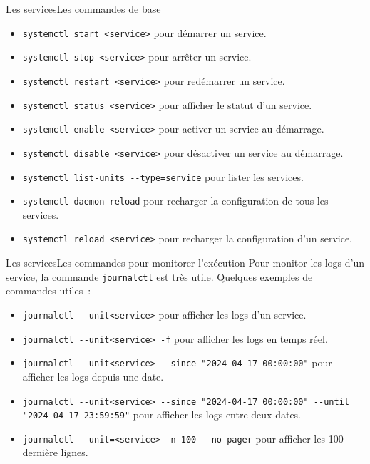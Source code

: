 \documentclass{beamer}
\begin{document}
    \begin{frame}{Les services}{Les commandes de base}
        \begin{itemize}
            \item \lstinline{systemctl start <service>} pour démarrer un service.
            \item \lstinline{systemctl stop <service>} pour arrêter un service.
            \item \lstinline{systemctl restart <service>} pour redémarrer un service.
            \item \lstinline{systemctl status <service>} pour afficher le statut d'un service.
            \item \lstinline{systemctl enable <service>} pour activer un service au démarrage.
            \item \lstinline{systemctl disable <service>} pour désactiver un service au démarrage.
            \item \lstinline{systemctl list-units --type=service} pour lister les services.
            \item \lstinline{systemctl daemon-reload} pour recharger la configuration de tous les services.
            \item \lstinline{systemctl reload <service>} pour recharger la configuration d'un service.
        \end{itemize}
    \end{frame}
    \begin{frame}{Les services}{Les commandes pour monitorer l'exécution}
        Pour monitor les logs d'un service, la commande \lstinline{journalctl} est très utile.
        \bigbreak
        Quelques exemples de commandes utiles~:
        \begin{itemize}
            \item \lstinline{journalctl --unit<service>} pour afficher les logs d'un service.
            \item \lstinline{journalctl --unit<service> -f} pour afficher les logs en temps réel.
            \item \lstinline{journalctl --unit<service> --since "2024-04-17 00:00:00"} pour afficher les logs depuis une date.
            \item \lstinline{journalctl --unit<service> --since "2024-04-17 00:00:00" --until "2024-04-17 23:59:59"} pour afficher les logs entre deux dates.
            \item \lstinline{journalctl --unit=<service> -n 100 --no-pager} pour afficher les 100 dernière lignes.
        \end{itemize}
    \end{frame}
\end{document}
